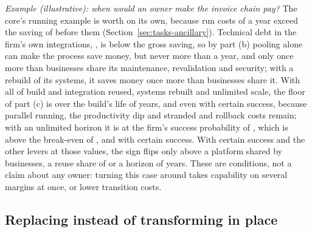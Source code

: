 \noindent\emph{Example (illustrative): when would an owner make the invoice chain pay?} The core's running example is worth \acqIcNpv{} on its own, because run costs of \acqIcCrun{} a year exceed the saving of \acqIcWzero{} before them (Section~\ref{sec:tasks-ancillary}). Technical debt in the firm's own integrations, \acqIcCspec, is below the gross saving, so by part (b) pooling alone can make the process save money, but never more than \acqIcLimNoReb{} a year, and only once more than \acqIcNminNoReb{} businesses share its maintenance, revalidation and security; with a rebuild of its systems, it saves money once more than \acqIcNmin{} businesses share it. With all \acqIcFreuse{} of build and integration reused, systems rebuilt and unlimited scale, the floor of part (c) is \acqIcFloorFour{} over the build's life of \acqIcTh{} years, and \acqIcFloorFourCertain{} even with certain success, because parallel running, the productivity dip and stranded and rollback costs remain; with an unlimited horizon it is \acqIcFloorInf{} at the firm's success probability of \acqIcVarpi, which is above the break-even of \acqIcVarpiBe, and \acqIcFloorVone{} with certain success. With certain success and the other levers at those values, the sign flips only above a platform shared by \acqIcNbe{} businesses, a reuse share of \acqIcUFbe{} or a horizon of \acqIcThbe{} years. These are conditions, not a claim about any owner: turning this case around takes capability on several margins at once, or lower transition costs.

\subsection{Replacing instead of transforming in place}\label{sec:acq-replace}

